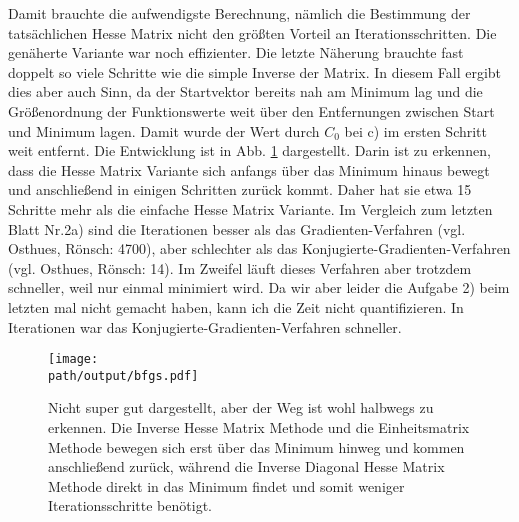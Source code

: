 \begin{enumerate}[label=\alph*)]
Damit brauchte die aufwendigste Berechnung, nämlich die Bestimmung der tatsächlichen Hesse Matrix nicht den größten Vorteil an Iterationsschritten. Die genäherte Variante war noch effizienter. Die letzte Näherung brauchte fast doppelt so viele Schritte wie die simple Inverse der Matrix. In diesem Fall ergibt dies aber auch Sinn, da der Startvektor bereits nah am Minimum lag und die Größenordnung der Funktionswerte weit über den Entfernungen zwischen Start und Minimum lagen. Damit wurde der Wert durch $C_0$ bei c) im ersten Schritt weit entfernt.
Die Entwicklung ist in Abb. \ref{fig:bfgs} dargestellt. Darin ist zu erkennen, dass die Hesse Matrix Variante sich anfangs über das Minimum hinaus bewegt und anschließend in einigen Schritten zurück kommt. Daher hat sie etwa 15 Schritte mehr als die einfache Hesse Matrix Variante.
Im Vergleich zum letzten Blatt Nr.2a) sind die Iterationen besser als das Gradienten-Verfahren (vgl. Osthues, Rönsch: 4700), aber schlechter als das Konjugierte-Gradienten-Verfahren (vgl. Osthues, Rönsch: 14). Im Zweifel läuft dieses Verfahren aber trotzdem schneller, weil nur einmal minimiert wird. Da wir aber leider die Aufgabe 2) beim letzten mal nicht gemacht haben, kann ich die Zeit nicht quantifizieren.
In Iterationen war das Konjugierte-Gradienten-Verfahren schneller.

\begin{figure}
    \centering
    \texttt{[image: \\path/output/bfgs.pdf]}
    \caption{Nicht super gut dargestellt, aber der Weg ist wohl halbwegs zu erkennen.
    Die Inverse Hesse Matrix Methode und die Einheitsmatrix Methode bewegen sich erst über das Minimum hinweg und kommen anschließend zurück, während die Inverse Diagonal Hesse Matrix Methode direkt in das Minimum findet und somit weniger Iterationsschritte benötigt.}
    \label{fig:bfgs}
\end{figure}
\end{enumerate}

